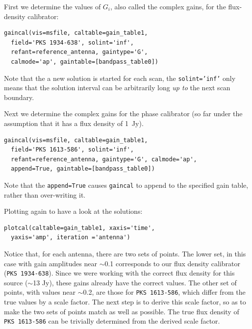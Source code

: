\documentclass[force,almostfull,justified]{tufte-book}
\begin{document}
First we determine the values of $G_i$, also called the complex gains, for the flux-density
calibrator:

\begin{casacmd}
\begin{verbatim}
gaincal(vis=msfile, caltable=gain_table1,
  field='PKS 1934-638', solint='inf',
  refant=reference_antenna, gaintype='G',
  calmode='ap', gaintable=[bandpass_table0])
\end{verbatim}
Note that the a new solution is started for each scan, the {\tt solint='inf'} only means that the
solution interval can be arbitrarily long {\em up to} the next scan boundary.
\end{casacmd}

Next we determine the complex gains for the phase calibrator (so far under the assumption that it has
a flux density of 1~Jy).

\begin{casacmd}
\begin{verbatim}
gaincal(vis=msfile, caltable=gain_table1,
  field='PKS 1613-586', solint='inf',
  refant=reference_antenna, gaintype='G', calmode='ap',
  append=True, gaintable=[bandpass_table0])
\end{verbatim}
Note that the {\tt append=True} causes {\tt gaincal} to append to the specified gain table, rather
than over-writing it.
\end{casacmd}

Plotting again to have a look at the solutions:

\begin{casacmd}
\begin{verbatim}
plotcal(caltable=gain_table1, xaxis='time',
  yaxis='amp', iteration ='antenna')
\end{verbatim}
\end{casacmd}

Notice that, for each antenna, there are two sets of points.  The lower set, in this case with gain
amplitudes near $\sim$0.1 corresponds to our flux density calibrator ({\tt PKS 1934-638}).  Since we
were working with the correct flux density for this source ($\sim$13 Jy), these gains already have the
correct values.  The other set of points, with values near $\sim$0.2, are those for {\tt PKS
1613-586}, which differ from the true values by a scale factor.  The next step is to derive this scale
factor, so as to make the two sets of points match as well as possible.  The true flux density of {\tt
PKS 1613-586} can be trivially determined from the derived scale factor.
\end{document}
